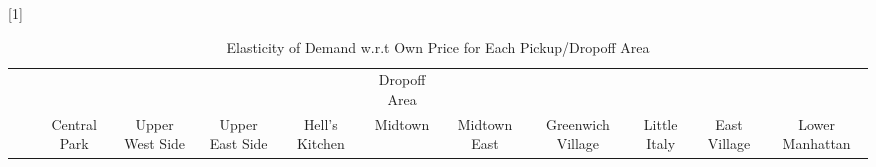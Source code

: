 

\begin{landscape}
\begin{table}[h]
\caption{Elasticity of Demand w.r.t Own Price for Each Pickup/Dropoff Area}\label{tab:each_lnfare}
{
\def\sym#1{\ifmmode^{#1}\else\(^{#1}\)\fi}
\begin{center}
\scalebox{0.65}[1]{
\begin{tabular}{l*{11}{c}}
\hline\hline
            &\multicolumn{1}{c}{}&
            \multicolumn{1}{c}{}&
            \multicolumn{1}{c}{}&
            \multicolumn{1}{c}{}&
            \multicolumn{1}{c}{}&
            \multicolumn{1}{c}{Dropoff Area}&
            \multicolumn{1}{c}{}&
            \multicolumn{1}{c}{}&
            \multicolumn{1}{c}{}&
            \multicolumn{1}{c}{}&
            \multicolumn{1}{c}{}
            \\
                        
            & &\multicolumn{1}{c}{Central Park}&
            \multicolumn{1}{c}{Upper West Side}&
            \multicolumn{1}{c}{Upper East Side}&
            \multicolumn{1}{c}{Hell's Kitchen}&
            \multicolumn{1}{c}{Midtown}&
            \multicolumn{1}{c}{Midtown East}&
            \multicolumn{1}{c}{Greenwich Village}&
            \multicolumn{1}{c}{Little Italy}&
            \multicolumn{1}{c}{East Village}&
            \multicolumn{1}{c}{Lower Manhattan}
            \\


\end{tabular}}
\end{center}}
\end{table}
\end{landscape}
